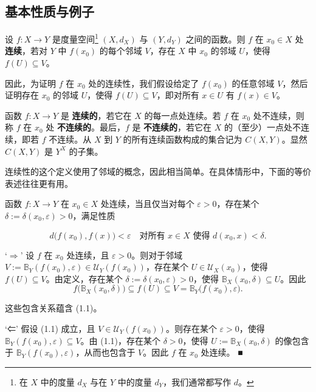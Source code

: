 \subsection*{基本性质与例子}

设 $f: X \to Y$ 是度量空间\footnote{在 $ X $ 中的度量 $ d_X $ 与在 $ Y $ 中的度量 $ d_Y $，我们通常都写作 $ d $。} $(X, d_X)$ 与 $(Y, d_Y)$ 之间的函数。则 $f$ 在 $x_0 \in X$ 处 \textbf{连续}，若对 $Y$ 中 $f(x_0)$ 的每个邻域 $V$，存在 $X$ 中 $x_0$ 的邻域 $U$，使得 $f(U) \subseteq V$。


因此，为证明 $f$ 在 $x_0$ 处的连续性，我们假设给定了 $f(x_0)$ 的任意邻域 $V$，然后证明存在 $x_0$ 的邻域 $U$，使得 $f(U) \subseteq V$，即对所有 $x \in U$ 有 $f(x) \in V$。

函数 $f: X \to Y$ 是 \textbf{连续的}，若它在 $X$ 的每一点处连续。若 $f$ 在 $x_0$ 处不连续，则称 $f$ 在 $x_0$ 处 \textbf{不连续的}。最后，$f$ 是 \textbf{不连续的}，若它在 $X$ 的（至少）一点处不连续，即若 $f$ 不连续。从 $X$ 到 $Y$ 的所有连续函数构成的集合记为 $C(X,Y)$。显然 $C(X,Y)$ 是 $Y^X$ 的子集。

连续性的这个定义使用了邻域的概念，因此相当简单。在具体情形中，下面的等价表述往往更有用。

\begin{proposition}

函数 $ f: X \to Y $ 在 $ x_0 \in X $ 处连续，当且仅当对每个 $ \varepsilon > 0 $，存在某个 $ \delta := \delta(x_0, \varepsilon) > 0 $，满足性质

\begin{equation}
d\big(f(x_{0}),f(x)\big)<\varepsilon\quad\text{对所有 }x\in X\text{ 使得 }d(x_{0},x)<\delta.
\end{equation}

\proofhead
‘$\Rightarrow$’ 设 $f$ 在 $x_0$ 处连续，且 $\varepsilon > 0$。则对于邻域 $V := \mathbb{B}_Y(f(x_0), \varepsilon) \in \mathcal{U}_Y(f(x_0))$，存在某个 $U \in \mathcal{U}_X(x_0)$，使得 $f(U) \subseteq V$。由定义，存在某个 $\delta := \delta(x_0, \varepsilon) > 0$，使得 $\mathbb{B}_X(x_0, \delta) \subseteq U$。因此
\[
f\bigl(\mathbb{B}_{X}(x_{0},\delta)\bigr)\subseteq f(U)\subseteq V=\mathbb{B}_{Y}\bigl(f(x_{0}),\varepsilon\bigr).
\]

这些包含关系蕴含 (1.1)。

‘⇐’ 假设 (1.1) 成立，且 $ V \in \mathcal{U}_Y(f(x_0)) $。则存在某个 $ \varepsilon > 0 $，使得 $ \mathbb{B}_Y(f(x_0), \varepsilon) \subseteq V $。由 (1.1)，存在某个 $ \delta > 0 $，使得 $ U := \mathbb{B}_X(x_0, \delta) $ 的像包含于 $ \mathbb{B}_Y(f(x_0), \varepsilon) $，从而也包含于 $ V $。因此 $ f $ 在 $ x_0 $ 处连续。 ■

\end{proposition}

